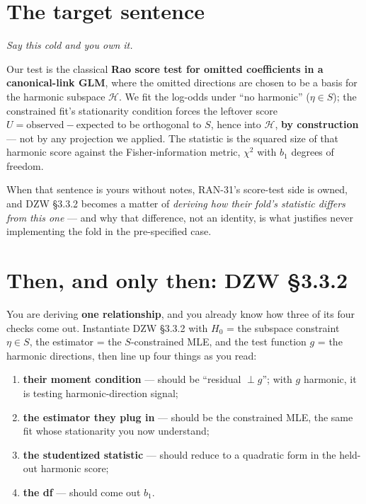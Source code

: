 \documentclass[11pt,a4paper]{article}
\newcommand{\Hh}{\mathcal{H}}
\theoremstyle{definition}
\begin{document}
\section{The target sentence}
\label{sec:target}

\emph{Say this cold and you own it.}

\begin{mdframed}[style=callout]
Our test is the classical \textbf{Rao score test for omitted coefficients in a
canonical-link GLM}, where the omitted directions are chosen to be a basis for
the harmonic subspace $\Hh$. We fit the log-odds under ``no harmonic''
($\eta\in S$); the constrained fit's stationarity condition forces the leftover
score $U=\text{observed}-\text{expected}$ to be orthogonal to $S$, hence into
$\Hh$, \textbf{by construction} --- not by any projection we applied. The
statistic is the squared size of that harmonic score against the
Fisher-information metric, $\chi^2$ with $b_1$ degrees of freedom.
\end{mdframed}

\noindent When that sentence is yours without notes, RAN-31's score-test side is
owned, and DZW \S3.3.2 becomes a matter of \emph{deriving how their fold's
statistic differs from this one} --- and why that difference, not an identity, is
what justifies never implementing the fold in the pre-specified case.

\section{Then, and only then: DZW \S3.3.2}

You are deriving \textbf{one relationship}, and you already know how three of its
four checks come out. Instantiate DZW \S3.3.2 with $H_0$ = the subspace
constraint $\eta\in S$, the estimator = the $S$-constrained MLE, and the test
function $g$ = the harmonic directions, then line up four things as you read:

\begin{enumerate}[leftmargin=1.6em,itemsep=0.3em]
\item \textbf{their moment condition} --- should be ``residual $\perp g$''; with
  $g$ harmonic, it is testing harmonic-direction signal;
\item \textbf{the estimator they plug in} --- should be the constrained MLE, the
  same fit whose stationarity you now understand;
\item \textbf{the studentized statistic} --- should reduce to a quadratic form in
  the held-out harmonic score;
\item \textbf{the df} --- should come out $b_1$.
\end{enumerate}
\end{document}
